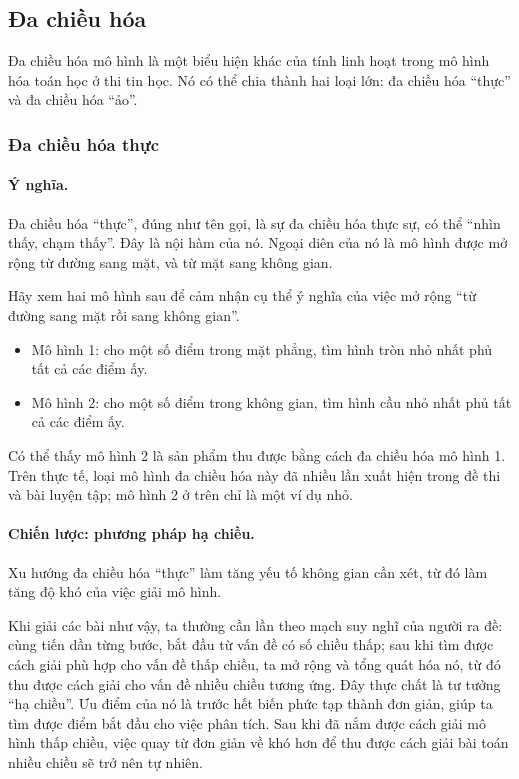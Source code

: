 \documentclass[11pt]{article}
\begin{document}
\subsection{Đa chiều hóa}

Đa chiều hóa mô hình là một biểu hiện khác của tính linh hoạt trong mô hình
hóa toán học ở thi tin học. Nó có thể chia thành hai loại lớn: đa chiều hóa
``thực'' và đa chiều hóa ``ảo''.

\subsubsection{Đa chiều hóa thực}

\paragraph{Ý nghĩa.}
Đa chiều hóa ``thực'', đúng như tên gọi, là sự đa chiều hóa thực sự, có thể
``nhìn thấy, chạm thấy''. Đây là nội hàm của nó. Ngoại diên của nó là mô hình
được mở rộng từ đường sang mặt, và từ mặt sang không gian.

Hãy xem hai mô hình sau để cảm nhận cụ thể ý nghĩa của việc mở rộng ``từ
đường sang mặt rồi sang không gian''.

\begin{itemize}
  \item Mô hình 1: cho một số điểm trong mặt phẳng, tìm hình tròn nhỏ nhất
  phủ tất cả các điểm ấy.
  \item Mô hình 2: cho một số điểm trong không gian, tìm hình cầu nhỏ nhất
  phủ tất cả các điểm ấy.
\end{itemize}

Có thể thấy mô hình 2 là sản phẩm thu được bằng cách đa chiều hóa mô hình 1.
Trên thực tế, loại mô hình đa chiều hóa này đã nhiều lần xuất hiện trong đề
thi và bài luyện tập; mô hình 2 ở trên chỉ là một ví dụ nhỏ.

\paragraph{Chiến lược: phương pháp hạ chiều.}
Xu hướng đa chiều hóa ``thực'' làm tăng yếu tố không gian cần xét, từ đó làm
tăng độ khó của việc giải mô hình.

Khi giải các bài như vậy, ta thường cần lần theo mạch suy nghĩ của người ra
đề: cùng tiến dần từng bước, bắt đầu từ vấn đề có số chiều thấp; sau khi tìm
được cách giải phù hợp cho vấn đề thấp chiều, ta mở rộng và tổng quát hóa nó,
từ đó thu được cách giải cho vấn đề nhiều chiều tương ứng. Đây thực chất là
tư tưởng ``hạ chiều''. Ưu điểm của nó là trước hết biến phức tạp thành đơn
giản, giúp ta tìm được điểm bắt đầu cho việc phân tích. Sau khi đã nắm được
cách giải mô hình thấp chiều, việc quay từ đơn giản về khó hơn để thu được
cách giải bài toán nhiều chiều sẽ trở nên tự nhiên.
\end{document}

